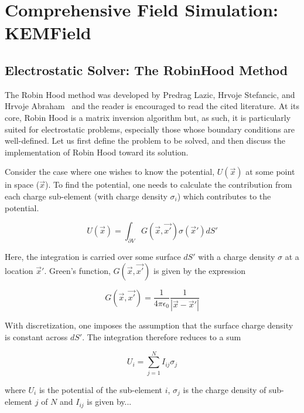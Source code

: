 
\section{Comprehensive Field Simulation: KEMField}\label{sec:KEMField}

\subsection{Electrostatic Solver: The RobinHood Method}

The Robin Hood method was developed by Predrag Lazic,  Hrvoje Stefancic, and Hrvoje Abraham~\cite{RH1,RH2} and the reader is encouraged to read the cited literature.  At its core, Robin Hood is a matrix inversion algorithm but, as such, it is particularly suited for electrostatic problems, especially those whose boundary conditions are well-defined. Let us first define the problem to be solved, and then discuss the implementation of Robin Hood toward its solution.

Consider the case where one wishes to know the potential, $U(\vec{x})$ at some point in space ($\vec{x}$).  To find the potential, one needs to calculate the contribution from each charge sub-element (with charge density $\sigma_i$) which contributes to the potential.  

\begin{equation}
U(\vec{x}) = \int_{\partial V} G(\vec{x},\vec{x'}) \sigma(\vec{x}') dS'
\end{equation}

\noindent Here, the integration is carried over some surface $dS'$ with a charge density $\sigma$ at a location $\vec{x}'$.  Green's function, $G(\vec{x},\vec{x'})$ is given by the expression

\begin{equation}
G(\vec{x},\vec{x'}) =  \frac{1}{4 \pi \epsilon_0} \frac{1}{|\vec{x}-\vec{x}'|}
\end{equation}

With discretization, one imposes the assumption that the surface charge density is constant across $dS'$.  The integration therefore reduces to a sum

\begin{equation}
U_i = \sum_{j=1}^N I_{ij} \sigma_j
\label{eq:potential}
\end{equation}

\noindent where $U_i$ is the potential of the sub-element $i$, $\sigma_j$ is the charge density of sub-element $j$ of $N$ and $I_{ij}$ is given by...

